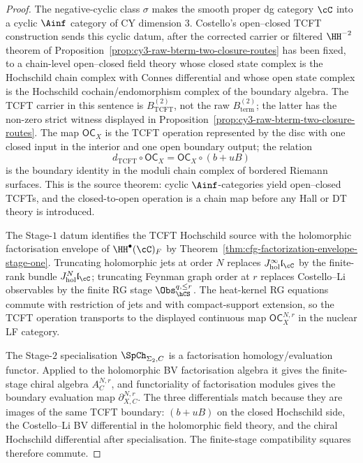 \begin{proof}
The negative-cyclic class $\sigma$ makes the smooth proper dg category
$\cC$ into a cyclic $\Ainf$ category of CY dimension $3$. Costello's
open--closed TCFT construction sends this cyclic datum, after the
corrected carrier or filtered $\HH^{-2}$ theorem of
Proposition~\ref{prop:cy3-raw-bterm-two-closure-routes} has been fixed,
to a chain-level open--closed field theory whose closed state complex is
the Hochschild chain complex with Connes differential and whose open
state complex is the Hochschild cochain/endomorphism complex of the
boundary algebra. The TCFT carrier in this sentence is
$B_{\mathrm{TCFT}}^{(2)}$, not the raw
$B_{\mathrm{term}}^{(2)}$; the latter has the non-zero strict witness
displayed in Proposition~\ref{prop:cy3-raw-bterm-two-closure-routes}.
The map $\mathsf{OC}_X$ is the TCFT operation represented by the disc with one
closed input in the interior and one open boundary output; the relation
\[
 d_{\mathrm{TCFT}}\circ \mathsf{OC}_X
 =
 \mathsf{OC}_X\circ(b+uB)
\]
is the boundary identity in the moduli chain complex of bordered
Riemann surfaces. This is the source theorem: cyclic
$\Ainf$-categories yield open--closed TCFTs, and the closed-to-open
operation is a chain map before any Hall or DT theory is introduced.

The Stage-$1$ datum identifies the TCFT Hochschild source with the
holomorphic factorisation envelope of
$\HH^\bullet(\cC)_F$ by
Theorem~\ref{thm:cfg-factorization-envelope-stage-one}. Truncating
holomorphic jets at order $N$ replaces
$J^\infty_{\mathrm{hol}}\mathfrak l_{\cC}$ by the finite-rank bundle
$J^N_{\mathrm{hol}}\mathfrak l_{\cC}$; truncating Feynman graph order at
$r$ replaces Costello--Li observables by the finite RG stage
$\Obs_{\hCS}^{q,\leq r}$. The heat-kernel RG equations commute with
restriction of jets and with compact-support extension, so the TCFT
operation transports to the displayed continuous map
$\mathsf{OC}_X^{N,r}$ in the nuclear LF category.

The Stage-$2$ specialisation $\SpCh_{\Sigma_2,C}$ is a factorisation
homology/evaluation functor. Applied to the holomorphic BV
factorisation algebra it gives the finite-stage chiral algebra
$A_C^{N,r}$, and functoriality of factorisation modules gives the
boundary evaluation map $\partial^{N,r}_{X,C}$. The three differentials
match because they are images of the same TCFT boundary:
$(b+uB)$ on the closed Hochschild side, the Costello--Li BV differential
in the holomorphic field theory, and the chiral Hochschild differential
after specialisation. The finite-stage compatibility squares therefore
commute.


\end{proof}

